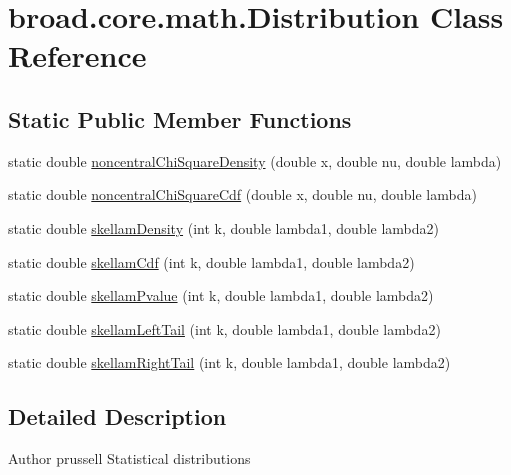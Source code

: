 \hypertarget{classbroad_1_1core_1_1math_1_1_distribution}{\section{broad.\+core.\+math.\+Distribution Class Reference}
\label{classbroad_1_1core_1_1math_1_1_distribution}
}
\subsection*{Static Public Member Functions}
\begin{DoxyCompactItemize}
\item 
static double \hyperlink{classbroad_1_1core_1_1math_1_1_distribution_a2907f057a903c55c45bcddda3f06dd68}{noncentral\+Chi\+Square\+Density} (double x, double nu, double lambda)
\item 
static double \hyperlink{classbroad_1_1core_1_1math_1_1_distribution_af9a429d1ca0e03e86e42d0e3cc9650d8}{noncentral\+Chi\+Square\+Cdf} (double x, double nu, double lambda)
\item 
static double \hyperlink{classbroad_1_1core_1_1math_1_1_distribution_afaa8ff22b9120443d6ea3b7002d1003c}{skellam\+Density} (int k, double lambda1, double lambda2)
\item 
static double \hyperlink{classbroad_1_1core_1_1math_1_1_distribution_a73bea7f039165ac6fcf44985214db058}{skellam\+Cdf} (int k, double lambda1, double lambda2)
\item 
static double \hyperlink{classbroad_1_1core_1_1math_1_1_distribution_ac6aac09e8f8d9e5ba35e5f660f151170}{skellam\+Pvalue} (int k, double lambda1, double lambda2)
\item 
static double \hyperlink{classbroad_1_1core_1_1math_1_1_distribution_ac3e4c327184f1372573b3fb1234b24c6}{skellam\+Left\+Tail} (int k, double lambda1, double lambda2)
\item 
static double \hyperlink{classbroad_1_1core_1_1math_1_1_distribution_a7257c404df002835e41fa723963ca9db}{skellam\+Right\+Tail} (int k, double lambda1, double lambda2)
\end{DoxyCompactItemize}


\subsection{Detailed Description}
\begin{DoxyAuthor}{Author}
prussell Statistical distributions 
\end{DoxyAuthor}


